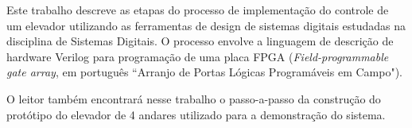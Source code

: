 \par Este trabalho descreve as etapas do processo de implementação do controle de um
elevador utilizando as ferramentas de design de sistemas digitais estudadas na
disciplina de Sistemas Digitais. O processo envolve a linguagem de descrição
de hardware Verilog para programação de uma placa FPGA (\textit{Field-programmable gate array}, em português ``Arranjo de Portas Lógicas Programáveis em Campo").
\par O leitor também encontrará nesse trabalho o passo-a-passo da construção do
protótipo do elevador de 4 andares utilizado para a demonstração do sistema. 
